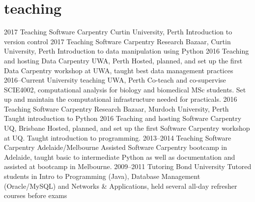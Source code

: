 \documentclass[]{friggeri-cv} %
\begin{document}

\section{teaching}

\begin{entrylist}
\entry
{2017}
{Teaching Software Carpentry}
{Curtin University, Perth}
{Introduction to version control}
\entry
{2017}
{Teaching Software Carpentry}
{Research Bazaar, Curtin University, Perth}
{Introduction to data manipulation using Python}
\entry
{2016}
{Teaching and hosting Data Carpentry}
{UWA, Perth}
{Hosted, planned, and set up the first Data Carpentry workshop at UWA, taught best data management practices}
\entry
{2016--Current}
{University teaching}
{UWA, Perth}
{Co-teach and co-supervise SCIE4002, computational analysis for biology and biomedical MSc students. Set up and maintain the computational infrastructure needed for practicals.}
\entry
{2016}
{Teaching Software Carpentry}
{Research Bazaar, Murdoch University, Perth}
{Taught introduction to Python}
\entry
{2016}
{Teaching and hosting Software Carpentry}
{UQ, Brisbane}
{Hosted, planned, and set up the first Software Carpentry workshop at UQ. Taught introduction to programming.}
\entry
{2013--2014}
{Teaching Software Carpentry}
{Adelaide/Melbourne}
{Assisted Software Carpentry bootcamp in Adelaide, taught basic to intermediate Python as well as documentation and assisted at bootcamp in Melbourne.}
\entry
{2009--2011}
{Tutoring}
{Bond University}
{Tutored students in Intro to Programming (Java), Database Management (Oracle/MySQL) and Networks \& Applications, held several all-day refresher courses before exams}
\end{entrylist}
\end{document}
